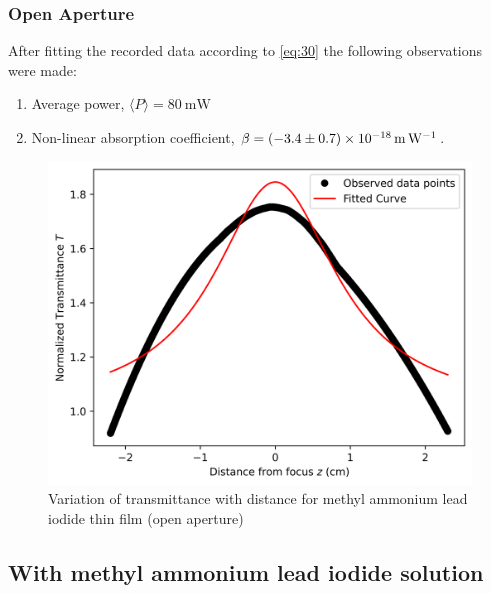 \documentclass[%
 reprint,
 amsmath,amssymb,
 aps,
]{revtex4-2}
\begin{document}
		\subsubsection{Open Aperture}
		After fitting the recorded data according to \eqref{eq:30} the following observations were made:
		\begin{enumerate} 
			\item Average power, $ \langle P \rangle  = \SI{80}{\milli \watt}$
			\item Non-linear absorption coefficient, $ \beta = \SI[separate-uncertainty=true]{-3.4 \pm 0.7e-18}{\meter \per \watt} $.
		\end{enumerate}
		\begin{figure}
			\includegraphics[scale = 0.59]{satys-o}
			\caption{Variation of transmittance with distance for methyl ammonium lead iodide thin film (open aperture)}
		\end{figure}
	
	\subsection{With methyl ammonium lead iodide solution}
\end{document}
